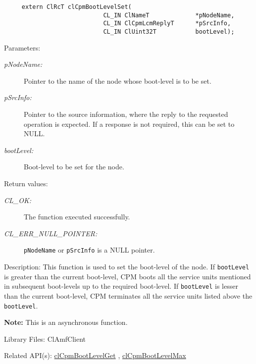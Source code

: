 {\begin{Desc}
\footnotesize\begin{verbatim}     extern ClRcT clCpmBootLevelSet(
                			CL_IN ClNameT             *pNodeName,
                			CL_IN ClCpmLcmReplyT      *pSrcInfo,
                			CL_IN ClUint32T           bootLevel);
\end{verbatim}
\normalsize
\end{Desc}
\begin{Desc}
\item[Parameters:]
\begin{description}
\item[{\em p\-Node\-Name:}]Pointer to the name of the node whose boot-level is to be set.
\item[{\em p\-Src\-Info:}]Pointer to the source information, where the reply to the requested operation is expected. 
If a response is not required, this can be set to NULL.
\item[{\em boot\-Level:}]Boot-level to be set for the node.
\end{description}
\end{Desc}
\begin{Desc}
\item[Return values:]
\begin{description}
\item[{\em CL\_\-OK:}]The function executed successfully. \item[{\em CL\_\-ERR\_\-NULL\_\-POINTER:}]{\tt{pNodeName}} or {\tt{pSrcInfo}} is a NULL pointer.
\end{description}
\end{Desc}
\begin{Desc}
\item[Description:]This function is used to set the boot-level of the node. If {\tt{boot\-Level}} is greater than the current boot-level, 
CPM boots all the service units mentioned in subsequent boot-levels up to the required boot-level. If {\tt{boot\-Level}} is lesser than the 
current boot-level, CPM terminates all the service units listed above the {\tt{boot\-Level}}.\end{Desc}
{\bf Note:} This is an asynchronous function.
\begin{Desc}
\item[Library Files:]Cl\-Amf\-Client\end{Desc}

\begin{Desc}
\item[Related API(s):]\hyperlink{group__group14}{cl\-Cpm\-Boot\-Level\-Get} , \hyperlink{group__group14}{cl\-Cpm\-Boot\-Level\-Max} \end{Desc}

}
